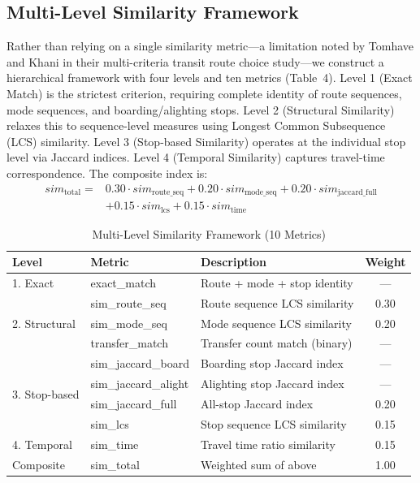\subsection{Multi-Level Similarity Framework}

Rather than relying on a single similarity metric---a limitation noted by
Tomhave and Khani \cite{tomhave2021} in their multi-criteria transit route
choice study---we construct a hierarchical framework with four levels and ten
metrics (Table~4). Level 1 (Exact Match) is the strictest criterion, requiring
complete identity of route sequences, mode sequences, and boarding/alighting
stops. Level 2 (Structural Similarity) relaxes this to sequence-level measures
using Longest Common Subsequence (LCS) similarity. Level 3 (Stop-based
Similarity) operates at the individual stop level via Jaccard indices. Level 4
(Temporal Similarity) captures travel-time correspondence. The composite index
is:
\begin{align*}
\mathit{sim}_{\mathrm{total}} ={}& 0.30\cdot\mathit{sim}_{\mathrm{route\_seq}}
 + 0.20\cdot\mathit{sim}_{\mathrm{mode\_seq}}
 + 0.20\cdot\mathit{sim}_{\mathrm{jaccard\_full}} \\
 &+ 0.15\cdot\mathit{sim}_{\mathrm{lcs}}
 + 0.15\cdot\mathit{sim}_{\mathrm{time}}
\end{align*}

\begin{table}[htbp]
\centering
\tablefont
\begin{tabular}{|l|l|l|c|}
\hline
\headrow
\textbf{Level} & \textbf{Metric} & \textbf{Description} & \textbf{Weight} \\
\hline
1. Exact & exact\_match & Route + mode + stop identity & --- \\
\hline
\multirow{3}{*}{2. Structural}
 & sim\_route\_seq  & Route sequence LCS similarity & 0.30 \\
 & sim\_mode\_seq   & Mode sequence LCS similarity  & 0.20 \\
 & transfer\_match  & Transfer count match (binary) & --- \\
\hline
\multirow{4}{*}{3. Stop-based}
 & sim\_jaccard\_board  & Boarding stop Jaccard index  & --- \\
 & sim\_jaccard\_alight & Alighting stop Jaccard index & --- \\
 & sim\_jaccard\_full   & All-stop Jaccard index       & 0.20 \\
 & sim\_lcs             & Stop sequence LCS similarity & 0.15 \\
\hline
4. Temporal & sim\_time  & Travel time ratio similarity & 0.15 \\
\hline
Composite   & sim\_total & Weighted sum of above        & 1.00 \\
\hline
\end{tabular}
\caption{Multi-Level Similarity Framework (10 Metrics)}
\end{table}

